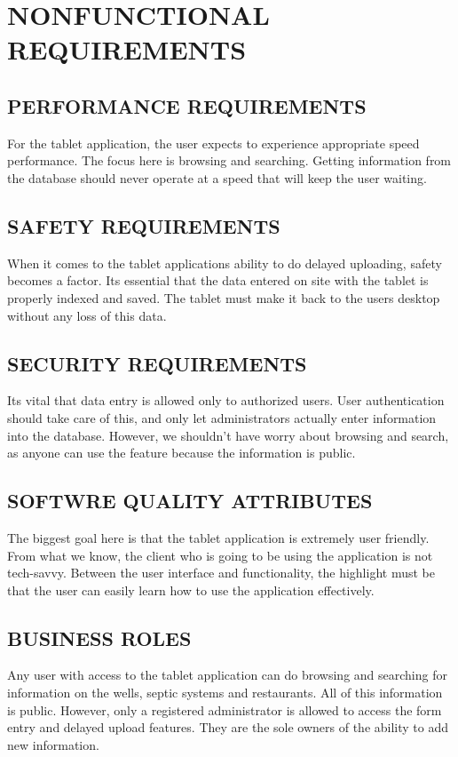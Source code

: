 \documentclass[twoside,letterpaper]{article}
\begin{document}
\clearpage\section[NONFUNCTIONAL REQUIREMENTS]{\rmfamily\bfseries\color{black}
NONFUNCTIONAL REQUIREMENTS}
{\rmfamily\color{black}

\subsection{PERFORMANCE REQUIREMENTS}
For the tablet application, the user expects to experience appropriate speed performance. The focus here is browsing and searching. Getting information from the database should never operate at a speed that will keep the user waiting. 

\subsection{SAFETY REQUIREMENTS}
When it comes to the tablet applications ability to do delayed uploading, safety becomes a factor. Its essential that the data entered on site with the tablet is properly indexed and saved. The tablet must make it back to the users desktop without any loss of this data. 

\subsection{SECURITY REQUIREMENTS}
Its vital that data entry is allowed only to authorized users. User authentication should take care of this, and only let administrators actually enter information into the database. However, we shouldn't have worry about browsing and search, as anyone can use the feature because the information is public.

\subsection{SOFTWRE QUALITY ATTRIBUTES}
The biggest goal here is that the tablet application is extremely user friendly. From what we know, the client who is going to be using the application is not tech-savvy. Between the user interface and functionality, the highlight must be that the user can easily learn how to use the application effectively.

\subsection{BUSINESS ROLES}
Any user with access to the tablet application can do browsing and searching for information on the wells, septic systems and restaurants. All of this information is public. However, only a registered administrator is allowed to access the form entry and delayed upload features. They are the sole owners of the ability to add new information.}
\end{document}
